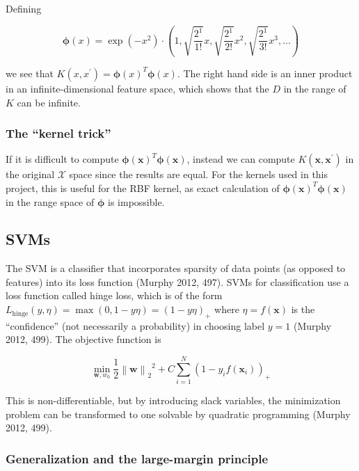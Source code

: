 \documentclass[letterpaper, 11pt]{article}
\newcommand{\norm}[1]{\left\lVert #1 \right\rVert}
\newcommand{\vect}[1]{\boldsymbol{#1}}
\begin{document}
Defining

\begin{equation*}
  \vect{\phi}(x) = \exp(-x^2) \cdot \left(1, \sqrt{\frac{2^1}{1!}}x, \sqrt{\frac{2^1}{2!}}x^2, \sqrt{\frac{2^1}{3!}}x^3, \ldots \right)
\end{equation*}

we see that $K(x, x^\prime) = \vect{\phi}(x)^T \vect{\phi}(x)$. The right hand side is an inner product in an infinite-dimensional feature space, which shows that the $D$ in the range of $K$ can be infinite.

\subsubsection{The ``kernel trick''}

If it is difficult to compute $\vect{\phi}(\vect{x})^T \vect{\phi}(\vect{x})$, instead we can compute $K(\vect{x}, \vect{x}^\prime)$ in the original $\mathcal{X}$ space since the results are equal. For the kernels used in this project, this is useful for the RBF kernel, as exact calculation of $\vect{\phi}(\vect{x})^T \vect{\phi}(\vect{x})$ in the range space of $\vect{\phi}$ is impossible. 

\subsection{SVMs}

The SVM is a classifier that incorporates sparsity of data points (as opposed to features) into its loss function (Murphy 2012, 497). SVMs for classification use a loss function called hinge loss, which is of the form $L_\text{hinge}(y, \eta) = \max(0, 1 - y \eta) = (1 - y\eta)_{+}$ where $\eta = f(\vect{x})$ is the ``confidence'' (not necessarily a probability) in choosing label $y = 1$ (Murphy 2012, 499). The objective function is

\begin{equation*}
  \min_{\vect{w}, w_0} \frac{1}{2}{\norm{\vect{w}}_2}^2 + C \sum_{i=1}^{N}(1 - y_i f(\vect{x}_i))_{+}
\end{equation*}

This is non-differentiable, but by introducing slack variables, the minimization problem can be transformed to one solvable by quadratic programming (Murphy 2012, 499).

\subsubsection{Generalization and the large-margin principle}
\end{document}
